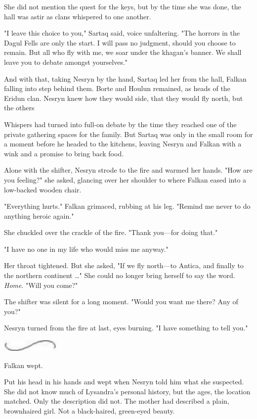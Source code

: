 She did not mention the quest for the keys, but by the time she was done, the hall was astir as clans whispered to one another.

"I leave this choice to you," Sartaq said, voice unfaltering. "The horrors in the Dagul Fells are only the start. I will pass no judgment, should you choose to remain. But all who fly with me, we soar under the khagan's banner. We shall leave you to debate amongst yourselves."

And with that, taking Nesryn by the hand, Sartaq led her from the hall, Falkan falling into step behind them. Borte and Houlun remained, as heads of the Eridun clan. Nesryn knew how they would side, that they would fly north, but the others 

Whispers had turned into full-on debate by the time they reached one of the private gathering spaces for the family. But Sartaq was only in the small room for a moment before he headed to the kitchens, leaving Nesryn and Falkan with a wink and a promise to bring back food.

Alone with the shifter, Nesryn strode to the fire and warmed her hands. "How are you feeling?" she asked, glancing over her shoulder to where Falkan eased into a low-backed wooden chair.

"Everything hurts." Falkan grimaced, rubbing at his leg. "Remind me never to do anything heroic again."

She chuckled over the crackle of the fire. "Thank you---for doing that."

"I have no one in my life who would miss me anyway."

Her throat tightened. But she asked, "If we fly north---to Antica, and finally to the northern continent \ldots" She could no longer bring herself to say the word. \emph{Home}. "Will you come?"

The shifter was silent for a long moment. "Would you want me there? Any of you?"

Nesryn turned from the fire at last, eyes burning. "I have something to tell you."

\includegraphics[width=1.12in,height=0.24in]{images/seperator}

Falkan wept.

Put his head in his hands and wept when Nesryn told him what she suspected. She did not know much of Lysandra's personal history, but the ages, the location matched. Only the description did not. The mother had described a plain, brownhaired girl. Not a black-haired, green-eyed beauty.

